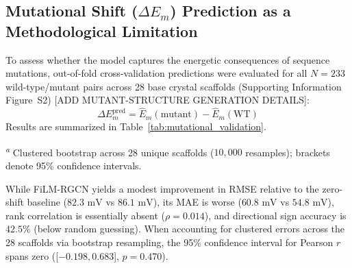 \documentclass[journal=jcisd8,manuscript=article]{achemso}
\begin{document}
\subsection{Mutational Shift ($\Delta E_m$) Prediction as a Methodological Limitation}
To assess whether the model captures the energetic consequences of sequence mutations, out-of-fold cross-validation predictions were evaluated for all $N = 233$ wild-type/mutant pairs across 28 base crystal scaffolds (Supporting Information Figure~S2) [ADD MUTANT-STRUCTURE GENERATION DETAILS]:
\begin{equation}
\Delta E_m^{\text{pred}} = \widehat{E}_m(\text{mutant}) - \widehat{E}_m(\text{WT})
\end{equation}
Results are summarized in Table~\ref{tab:mutational_validation}.

\begin{table}[htbp]
\centering
\caption{Out-of-Fold Evaluation of Predicted Mutational Shifts ($\Delta E_m$) on $N = 233$ Pairs (28 Base Scaffolds)}
\label{tab:mutational_validation}
\vspace{1ex}
\raggedright
\footnotesize
\textsuperscript{\emph{a}} Clustered bootstrap across 28 unique scaffolds ($10{,}000$ resamples); brackets denote 95\% confidence intervals.
\end{table}

While FiLM-RGCN yields a modest improvement in RMSE relative to the zero-shift baseline ($82.3\text{ mV}$ vs $86.1\text{ mV}$), its MAE is worse ($60.8\text{ mV}$ vs $54.8\text{ mV}$), rank correlation is essentially absent ($\rho = 0.014$), and directional sign accuracy is $42.5\%$ (below random guessing). When accounting for clustered errors across the 28 scaffolds via bootstrap resampling, the 95\% confidence interval for Pearson $r$ spans zero ([$ -0.198, 0.683$], $p = 0.470$).
\end{document}
